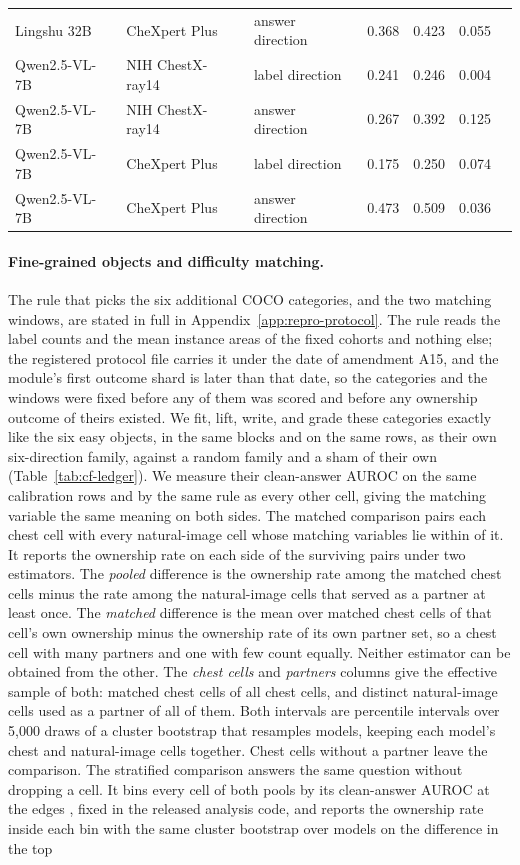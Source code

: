 \documentclass{article}
\begin{document}
\begin{table}[htbp]
{\begin{tabular}{lllcccc}
Lingshu 32B & CheXpert Plus & answer direction & 0.368 & 0.423 & 0.055 & \\
Qwen2.5-VL-7B & NIH ChestX-ray14 & label direction & 0.241 & 0.246 & 0.004 & \\
Qwen2.5-VL-7B & NIH ChestX-ray14 & answer direction & 0.267 & 0.392 & 0.125 & \\
Qwen2.5-VL-7B & CheXpert Plus & label direction & 0.175 & 0.250 & 0.074 & \\
Qwen2.5-VL-7B & CheXpert Plus & answer direction & 0.473 & 0.509 & 0.036 & \\
\bottomrule
\end{tabular}}
\end{table}

\paragraph{Fine-grained objects and difficulty matching.} The rule that picks the six additional COCO categories, and the two matching windows, are stated in full in Appendix~\ref{app:repro-protocol}. The rule reads the label counts and the mean instance areas of the fixed cohorts and nothing else; the registered protocol file carries it under the date of amendment A15, and the module's first outcome shard is later than that date, so the categories and the windows were fixed before any of them was scored and before any ownership outcome of theirs existed. We fit, lift, write, and grade these categories exactly like the six easy objects, in the same blocks and on the same rows, as their own six-direction family, against a random family and a sham of their own (Table~\ref{tab:cf-ledger}). We measure their clean-answer AUROC on the same calibration rows and by the same rule as every other cell, giving the matching variable the same meaning on both sides. The matched comparison pairs each chest cell with every natural-image cell whose matching variables lie within \cfFgWindow{} of it. It reports the ownership rate on each side of the surviving pairs under two estimators. The \emph{pooled} difference is the ownership rate among the matched chest cells minus the rate among the natural-image cells that served as a partner at least once. The \emph{matched} difference is the mean over matched chest cells of that cell's own ownership minus the ownership rate of its own partner set, so a chest cell with many partners and one with few count equally. Neither estimator can be obtained from the other. The \emph{chest cells} and \emph{partners} columns give the effective sample of both: matched chest cells of all chest cells, and distinct natural-image cells used as a partner of all of them. Both intervals are percentile intervals over 5{,}000 draws of a cluster bootstrap that resamples models, keeping each model's chest and natural-image cells together. Chest cells without a partner leave the comparison. The stratified comparison answers the same question without dropping a cell. It bins every cell of both pools by its clean-answer AUROC at the edges \cfStratEdges{}, fixed in the released analysis code, and reports the ownership rate inside each bin with the same cluster bootstrap over models on the difference in the top 
\end{document}
